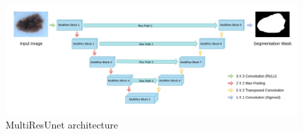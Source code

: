\begin{figure}
    \centerline{\includegraphics[width=1\columnwidth]{04-methodology/figures/multiresunet-architecture.png}}
    \caption{MultiResUnet architecture}
    \label{figure:multiresunet-architecture}
\end{figure}